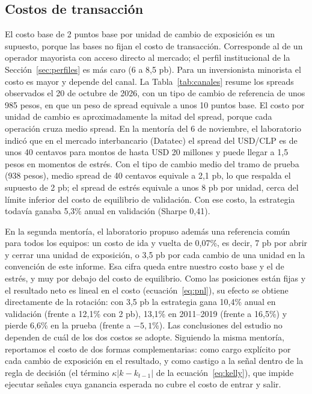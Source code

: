 \documentclass[11pt,a4paper]{article}
\begin{document}
\subsection{Costos de transacción}\label{sec:costos}
El costo base de 2 puntos base por unidad de cambio de exposición es un supuesto, porque las bases no fijan el costo de transacción. Corresponde al de un operador mayorista con acceso directo al mercado; el perfil institucional de la Sección~\ref{sec:perfiles} es más caro (6 a 8,5 pb). Para un inversionista minorista el costo es mayor y depende del canal. La Tabla~\ref{tab:canales} resume los spreads observados el 20 de octubre de 2026, con un tipo de cambio de referencia de unos 985 pesos, en que un peso de spread equivale a unos 10 puntos base. El costo por unidad de cambio es aproximadamente la mitad del spread, porque cada operación cruza medio spread. En la mentoría del 6 de noviembre, el laboratorio indicó que en el mercado interbancario (Datatec) el spread del USD/CLP es de unos 40 centavos para montos de hasta USD 20 millones y puede llegar a 1,5 pesos en momentos de estrés. Con el tipo de cambio medio del tramo de prueba (938 pesos), medio spread de 40 centavos equivale a 2,1 pb, lo que respalda el supuesto de 2 pb; el spread de estrés equivale a unos 8 pb por unidad, cerca del límite inferior del costo de equilibrio de validación. Con ese costo, la estrategia todavía ganaba 5,3\% anual en validación (Sharpe 0,41).

En la segunda mentoría, el laboratorio propuso además una referencia común para todos los equipos: un costo de ida y vuelta de 0,07\%, es decir, 7 pb por abrir y cerrar una unidad de exposición, o 3,5 pb por cada cambio de una unidad en la convención de este informe. Esa cifra queda entre nuestro costo base y el de estrés, y muy por debajo del costo de equilibrio. Como las posiciones están fijas y el resultado neto es lineal en el costo (ecuación~\ref{eq:pnl}), su efecto se obtiene directamente de la rotación: con 3,5 pb la estrategia gana 10,4\% anual en validación (frente a 12,1\% con 2 pb), 13,1\% en 2011--2019 (frente a 16,5\%) y pierde 6,6\% en la prueba (frente a $-5{,}1$\%). Las conclusiones del estudio no dependen de cuál de los dos costos se adopte. Siguiendo la misma mentoría, reportamos el costo de dos formas complementarias: como cargo explícito por cada cambio de exposición en el resultado, y como castigo a la señal dentro de la regla de decisión (el término \(\kappa|k-k_{t-1}|\) de la ecuación~\ref{eq:kelly}), que impide ejecutar señales cuya ganancia esperada no cubre el costo de entrar y salir.
\end{document}
